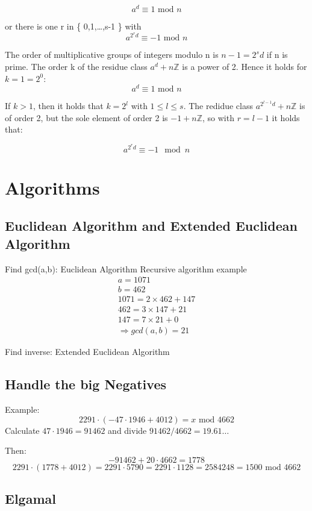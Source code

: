 \documentclass[a4paper]{article}
\begin{document}
\[ a^d \equiv 1 \text{ mod } n \]

or there is one r in \{ 0,1,\dots,s-1 \} with
\[ a^{2^r d} \equiv -1 \text{ mod } n \]

The order of multiplicative groups of integers modulo n is $n-1=2^sd$ if n is prime. The order k of the residue class $a^d + n\mathbb{Z}$ is a power of 2. Hence it holds for $k = 1 = 2^0$:
\[ a^d \equiv 1 \text{ mod } n \]

If $k>1$, then it holds that $k=2^l$ with $1 \leq l \leq s$. The redidue class $a^{2^{l-1}d} + n\mathbb{Z}$ is of order 2, but the sole element of order 2 is $-1 + n\mathbb{Z}$, so with $r=l-1$ it holds that:

\[ a^{2^rd} \equiv -1 \mod n \]


\section{Algorithms}
\subsection{Euclidean Algorithm and Extended Euclidean Algorithm}
Find gcd(a,b): Euclidean Algorithm
Recursive algorithm example 
\begin{equation}
    \begin{split}
	a = 1071 \\
	b = 462 \\
	1071 = 2 \times 462 +  147 \\
	462 = 3 \times  147 + 21 \\
	147 = 7 \times 21 + 0 \\ 
	\Rightarrow gcd(a,b) = 21
    \end{split}
        \label{euclidean_example}
\end{equation}

Find inverse: Extended Euclidean Algorithm
\subsection{Handle the big Negatives}
Example:
\[ 2291 \cdot (-47 \cdot 1946 + 4012) = x \text{ mod } 4662\]
Calculate $47 \cdot 1946 = 91462$ and divide $91462/4662 = 19.61\dots$

Then:
\[ -91462 + 20 \cdot 4662 = 1778 \]
\[2291 \cdot (1778 + 4012) = 2291 \cdot 5790 = 2291 \cdot 1128 = 2584248 = 1500 \text{ mod } 4662\]
\subsection{Elgamal}
\end{document}
